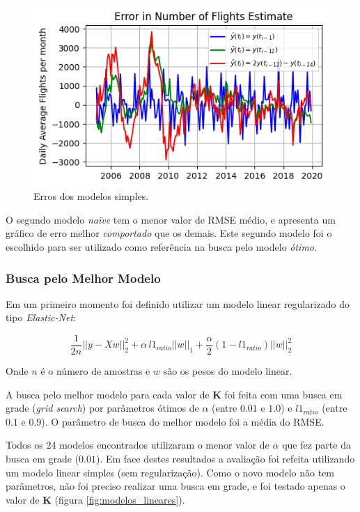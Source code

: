 \documentclass[final,5p]{elsarticle}
\numberwithin{equation}{section}
\begin{document}
        \begin{figure}[hbt!]
            \includegraphics[width=0.95\columnwidth]{B1_NaiveErrors.png}
            \caption{Erros dos modelos simples.}
            \label{fig:naive_erros}
        \end{figure}

    O segundo modelo \emph{naïve} tem o menor valor de RMSE médio, e apresenta um gráfico de erro melhor \emph{comportado} que os demais. Este segundo modelo foi o escolhido para ser utilizado como referência na busca pelo modelo \emph{ótimo}.

    \subsubsection{Busca pelo Melhor Modelo}

    Em um primeiro momento foi definido utilizar um modelo linear regularizado do tipo \emph{Elastic-Net}:

    \begin{equation}
        \frac{1}{2 n} ||y - Xw||^2_2 + \alpha{} \, l1_{ratio} ||w||_1 + \frac{\alpha{}}{2} (1 - l1_{ratio}) ||w||^2_2
    \end{equation}

    \noindent Onde $n$ é o número de amostras e $w$ são os pesos do modelo linear.

    A busca pelo melhor modelo para cada valor de \textbf{K} foi feita com uma busca em grade (\emph{grid search}) por parâmetros ótimos de $\alpha{}$ (entre $0.01$ e $1.0$) e $l1_{ratio}$ (entre $0.1$ e $0.9$). O parâmetro de busca do melhor modelo foi a média do RMSE.

    Todos os 24 modelos encontrados utilizaram o menor valor de $\alpha{}$ que fez parte da busca em grade ($0.01$). Em face destes resultados a avaliação foi refeita utilizando um modelo linear simples (sem regularização). Como o novo modelo não tem parâmetros, não foi preciso realizar uma busca em grade, e foi testado apenas o valor de \textbf{K} (figura \ref{fig:modelos_lineares}).
\end{document}
